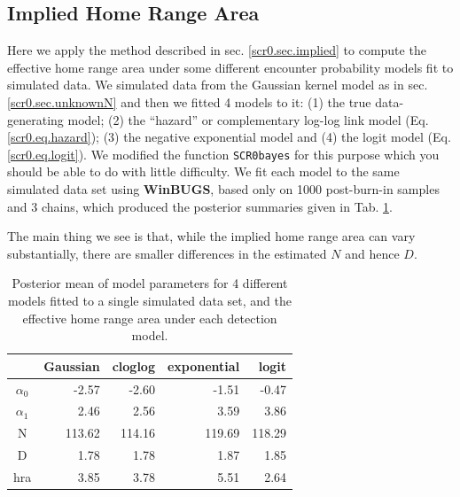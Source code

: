 \subsection{Implied Home Range Area}

Here we apply the method described in sec. \ref{scr0.sec.implied} to
compute the effective home range area under some different encounter
probability models fit to simulated data.
We simulated data from the Gaussian kernel model as in
sec. \ref{scr0.sec.unknownN} and then we fitted 4 models to it: (1)
the true data-generating model; (2) the ``hazard'' or complementary log-log link
model (Eq. \ref{scr0.eq.hazard}); (3) the negative exponential model
and (4) the logit model (Eq. \ref{scr0.eq.logit}).
We modified the function \mbox{\tt  SCR0bayes} for this purpose which
you should be able to do with little difficulty. We fit each model to
the same simulated  data set using {\bf WinBUGS}, based only on 1000
post-burn-in samples and 3 chains, which produced the posterior
summaries given in Tab. \ref{scr0.tab.implied}.

The main thing we see is that, while the implied home range area can
vary substantially, there
are smaller differences in the estimated $N$ and hence $D$.


\begin{table}
\centering
\caption{
Posterior mean of model parameters for 4 different models fitted to a
single simulated data set,
  and the effective home range area under each detection model.
}
\begin{tabular}{crrrr}
\hline \hline
     &  Gaussian & cloglog &exponential & logit \\  \hline
$\alpha_0$  &  -2.57 &  -2.60 & -1.51 & -0.47 \\
$\alpha_1$  &  2.46  & 2.56  & 3.59  & 3.86 \\
N           & 113.62& 114.16 &119.69& 118.29 \\
D           & 1.78  & 1.78  & 1.87  & 1.85 \\
hra         & 3.85  & 3.78 &  5.51  & 2.64 \\
\hline
\end{tabular}
\label{scr0.tab.implied}
\end{table}



